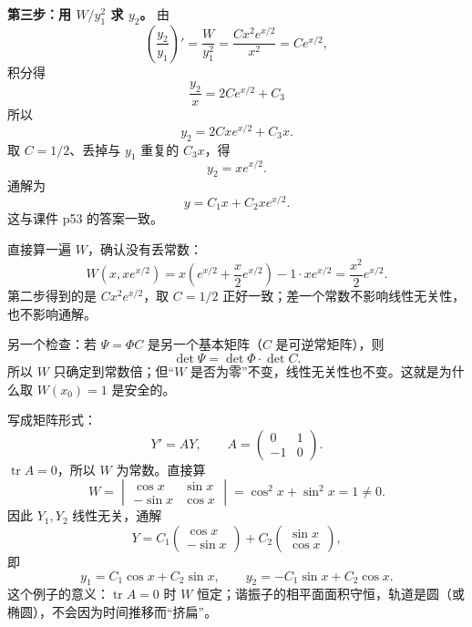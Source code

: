 \documentclass[11pt]{ctexart}
\let\origsubhdr\subhdr
\renewcommand{\subhdr}[1]{\needspace{3\baselineskip}\origsubhdr{#1}}
\newcommand{\tr}{\operatorname{tr}}
\begin{document}
\textbf{第三步：用 $W/y_1^2$ 求 $y_2$。} 由
\[
\left(\frac{y_2}{y_1}\right)'=\frac{W}{y_1^2}
=\frac{Cx^2e^{x/2}}{x^2}=Ce^{x/2},
\]
积分得
\[
\frac{y_2}{x}=2Ce^{x/2}+C_3
\]
所以
\[
y_2=2Cxe^{x/2}+C_3x.
\]
取 $C=1/2$、丢掉与 $y_1$ 重复的 $C_3x$，得
\[
y_2=xe^{x/2}.
\]
通解为
\[
y=C_1x+C_2xe^{x/2}.
\]
这与课件 p53 的答案一致。


直接算一遍 $W$，确认没有丢常数：
\[
W(x,xe^{x/2})
=x\left(e^{x/2}+\frac{x}{2}e^{x/2}\right)-1\cdot xe^{x/2}
=\frac{x^2}{2}e^{x/2}.
\]
第二步得到的是 $Cx^2e^{x/2}$，取 $C=1/2$ 正好一致；差一个常数不影响线性无关性，也不影响通解。

另一个检查：若 $\Psi=\Phi C$ 是另一个基本矩阵（$C$ 是可逆常矩阵），则
\[
\det\Psi=\det\Phi\cdot\det C.
\]
所以 $W$ 只确定到常数倍；但“$W$ 是否为零”不变，线性无关性也不变。这就是为什么取 $W(x_0)=1$ 是安全的。




写成矩阵形式：
\[
Y'=AY,\qquad A=\begin{pmatrix}0&1\\-1&0\end{pmatrix}.
\]
$\tr A=0$，所以 $W$ 为常数。直接算
\[
W=\begin{vmatrix}
\cos x&\sin x\\
-\sin x&\cos x
\end{vmatrix}
=\cos^2x+\sin^2x=1\neq0.
\]
因此 $Y_1,Y_2$ 线性无关，通解
\[
Y=C_1\begin{pmatrix}\cos x\\-\sin x\end{pmatrix}
+C_2\begin{pmatrix}\sin x\\\cos x\end{pmatrix},
\]
即
\[
y_1=C_1\cos x+C_2\sin x,\qquad
y_2=-C_1\sin x+C_2\cos x.
\]
这个例子的意义：$\tr A=0$ 时 $W$ 恒定；谐振子的相平面面积守恒，轨道是圆（或椭圆），不会因为时间推移而“挤扁”。

\end{document}
